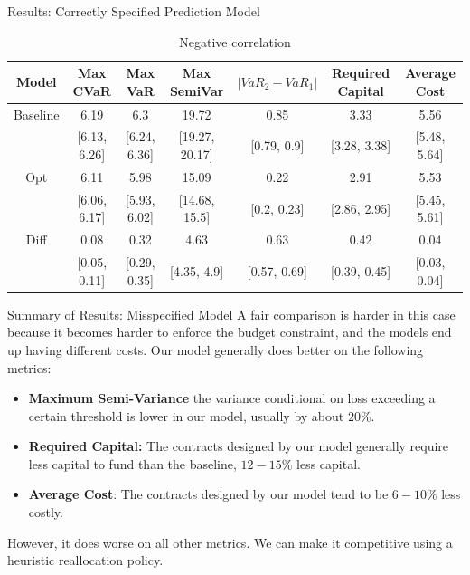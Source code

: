 \documentclass{beamer}
\begin{document}
\begin{frame}{Results: Correctly Specified Prediction Model}
\fontsize{6.5pt}{8pt}\selectfont
\begin{table}
    \centering 
    \begin{tabular}{ccccccc}
        \toprule
           Model &     Max CVaR &      Max VaR &    Max SemiVar & $|VaR_2 - VaR_1|$ & Required Capital & Average Cost \\
        \midrule
        Baseline &         6.19 &          6.3 &          19.72 &              0.85 &             3.33 &         5.56 \\
                 & [6.13, 6.26] & [6.24, 6.36] & [19.27, 20.17] &       [0.79, 0.9] &     [3.28, 3.38] & [5.48, 5.64] \\
             Opt &         6.11 &         5.98 &          15.09 &              0.22 &             2.91 &         5.53 \\
                 & [6.06, 6.17] & [5.93, 6.02] &  [14.68, 15.5] &       [0.2, 0.23] &     [2.86, 2.95] & [5.45, 5.61] \\
            Diff &         0.08 &         0.32 &           4.63 &              0.63 &             0.42 &         0.04 \\
                 & [0.05, 0.11] & [0.29, 0.35] &    [4.35, 4.9] &      [0.57, 0.69] &     [0.39, 0.45] & [0.03, 0.04] \\
        \bottomrule
        \end{tabular}
        \caption{Negative correlation}
\end{table}
\end{frame}

\begin{frame}{Summary of Results: Misspecified Model}
    A fair comparison is harder in this case because it becomes harder to enforce the budget constraint, and the models end up having different costs. Our model generally does better on the following metrics: 
    \begin{itemize}
      \setlength\itemsep{1em}
        
      \item \textbf{Maximum Semi-Variance} the variance conditional on loss exceeding a certain threshold is lower in our model, usually by about $20\%$.
        
        \item \textbf{Required Capital:} The contracts designed by our model generally require less capital to fund than the baseline, $12-15\%$ less capital. 
        \item \textbf{Average Cost}: The contracts designed by our model tend to be $6-10\%$ less costly. 
    \end{itemize}
    However, it does worse on all other metrics. We can make it competitive using a heuristic reallocation policy. 
    \end{frame}
\end{document}
